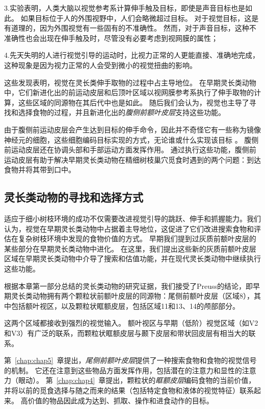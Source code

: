 3.实验表明，人类大脑以视觉参考系计算伸手触及目标，即使是声音目标也是如此。
如果目标位于人的外围视野中，人们会略微超过目标。
对于视觉目标，这是有道理的，因为外围视觉有一些固有的不准确性。
然而，对于声音目标，这种不准确性也会出现在伸手触及时，尽管没有必要考虑到视网膜的属性；\par


4.先天失明的人进行视觉引导的运动时，比视力正常的人更能直接、准确地完成，这种现象是因为视力正常的人会受到微小的视觉扭曲的影响。


这些发现表明，视觉在灵长类伸手取物的过程中占主导地位。
在早期灵长类动物中，它们新进化出的前运动皮层和后顶叶区域以视网膜参考系执行了伸手取物的计算，这些区域的同源物在其后代中也是如此。
随后我们会认为，视觉也主导了寻找和选择食物的过程，并且新进化出的\textit{腹侧前额叶皮层}支持这些功能。


由于腹侧前运动皮层会产生达到目标的伸手命令，因此并不奇怪它有一些称为镜像神经元的细胞，这些细胞编码目标实现的方式，无论谁或什么实现该目标 \cite{umilta2001know}。
腹侧前运动皮层还在协调头部和手部运动方面发挥作用。
通过执行这些功能，腹侧前运动皮层有助于解决早期灵长类动物在精细树枝巢穴觅食时遇到的两个问题：到达食物并将其带到口中。



\subsection{灵长类动物的寻找和选择方式}

适应于细小树枝环境的成功不仅需要改进视觉引导的跳跃、伸手和抓握能力。我们认为，视觉在早期灵长类动物中占据着主导地位，这促进了它们改进搜索食物和评估在复杂树枝环境中发现的食物价值的方式。
早期我们提到过灰质前额叶皮层的某些部分在早期灵长类动物中进化。
在这里，我们提出这些新的灰质前额叶皮层区域在早期灵长类动物中介导了搜索和估值功能，并在现代灵长类动物中继续执行这些功能。


根据本章第一部分总结的灵长类动物的研究证据，我们接受了Preuss的结论，即早期灵长类动物拥有两个颗粒状前额叶皮层的同源物：尾侧前额叶皮层（区域8），其中包括额叶视区，以及颗粒状眶额皮层，包括区域11和13、14的颅部部分。


这两个区域都接收到强烈的视觉输入。
额叶视区与早期（低阶）视觉区域（如V2和V3）有广泛的联系\cite{stanton1995topography}，而颗粒状眶额皮层与颞下皮层和带状回皮层有相当大的联系\cite{saleem2008complementary}。


第~\ref{chap:chap5}~章提出，\textit{尾侧前额叶皮层}提供了一种搜索食物和食物的视觉信号的机制。
它还在注意到这些物品方面发挥作用，包括潜在的注意力和显性的注意力（眼动）。
第~\ref{chap:chap4}~章提出，颗粒状的\textit{眶额皮层}编码食物的当前价值，并将以前的觅食选择与随之而来的结果（包括特定食物和液体的视觉特征）联系起来。
高价值的物品因此成为达到、抓取、操作和进食动作的目标。




